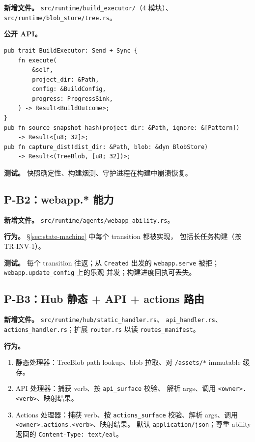 \documentclass[11pt,a4paper]{article}
\theoremstyle{definition}
\begin{document}
\textbf{新增文件。} \texttt{src/runtime/build\_executor/}（4 模块）、
\texttt{src/runtime/blob\_store/tree.rs}。

\textbf{公开 API。}
\begin{lstlisting}
pub trait BuildExecutor: Send + Sync {
    fn execute(
        &self,
        project_dir: &Path,
        config: &BuildConfig,
        progress: ProgressSink,
    ) -> Result<BuildOutcome>;
}
pub fn source_snapshot_hash(project_dir: &Path, ignore: &[Pattern])
    -> Result<[u8; 32]>;
pub fn capture_dist(dist_dir: &Path, blob: &dyn BlobStore)
    -> Result<(TreeBlob, [u8; 32])>;
\end{lstlisting}

\textbf{测试。} 快照确定性、构建烟测、守护进程在构建中崩溃恢复。

\subsection{P-B2：webapp.* 能力}

\textbf{新增文件。} \texttt{src/runtime/agents/webapp\_ability.rs}。

\textbf{行为。} \S\ref{sec:state-machine} 中每个 transition 都被实现，
包括长任务构建（按 TR-INV-1）。

\textbf{测试。} 每个 transition 往返；从 \texttt{Created} 出发的
\texttt{webapp.serve} 被拒；\texttt{webapp.update\_config} 上的乐观
并发；构建进度回执可丢失。

\subsection{P-B3：Hub 静态 + API + actions 路由}

\textbf{新增文件。} \texttt{src/runtime/hub/static\_handler.rs}、
\texttt{api\_handler.rs}、\texttt{actions\_handler.rs}；扩展
\texttt{router.rs} 以读 \texttt{routes\_manifest}。

\textbf{行为。}
\begin{enumerate}[leftmargin=2em,itemsep=0.1em]
    \item 静态处理器：TreeBlob path lookup、blob 拉取、对
    \texttt{/assets/*} immutable 缓存。
    \item API 处理器：捕获 verb、按 \texttt{api\_surface} 校验、
    解析 args、调用 \texttt{<owner>.<verb>}、映射结果。
    \item Actions 处理器：捕获 verb、按 \texttt{actions\_surface}
    校验、解析 args、调用 \texttt{<owner>.actions.<verb>}、映射结果。
    默认 \texttt{application/json}；尊重 ability 返回的
    \texttt{Content-Type: text/eal}。
\end{enumerate}
\end{document}
